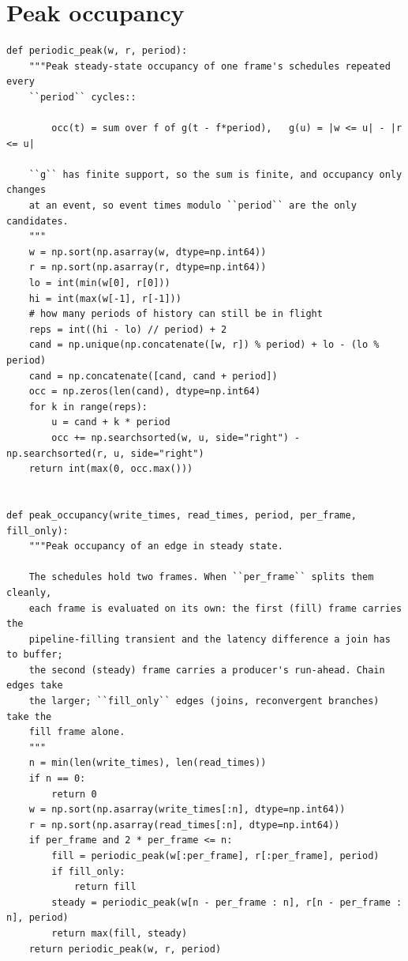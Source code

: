 \documentclass[10pt,a4paper]{article}
\begin{document}
\section{Peak occupancy}\label{sec:peak}

\begin{lstlisting}[firstnumber=306,title={\texttt{src/finn/transformation/fpgadataflow/derive\_characteristic.py}, lines 306--351}]
def periodic_peak(w, r, period):
    """Peak steady-state occupancy of one frame's schedules repeated every
    ``period`` cycles::

        occ(t) = sum over f of g(t - f*period),   g(u) = |w <= u| - |r <= u|

    ``g`` has finite support, so the sum is finite, and occupancy only changes
    at an event, so event times modulo ``period`` are the only candidates.
    """
    w = np.sort(np.asarray(w, dtype=np.int64))
    r = np.sort(np.asarray(r, dtype=np.int64))
    lo = int(min(w[0], r[0]))
    hi = int(max(w[-1], r[-1]))
    # how many periods of history can still be in flight
    reps = int((hi - lo) // period) + 2
    cand = np.unique(np.concatenate([w, r]) % period) + lo - (lo % period)
    cand = np.concatenate([cand, cand + period])
    occ = np.zeros(len(cand), dtype=np.int64)
    for k in range(reps):
        u = cand + k * period
        occ += np.searchsorted(w, u, side="right") - np.searchsorted(r, u, side="right")
    return int(max(0, occ.max()))


def peak_occupancy(write_times, read_times, period, per_frame, fill_only):
    """Peak occupancy of an edge in steady state.

    The schedules hold two frames. When ``per_frame`` splits them cleanly,
    each frame is evaluated on its own: the first (fill) frame carries the
    pipeline-filling transient and the latency difference a join has to buffer;
    the second (steady) frame carries a producer's run-ahead. Chain edges take
    the larger; ``fill_only`` edges (joins, reconvergent branches) take the
    fill frame alone.
    """
    n = min(len(write_times), len(read_times))
    if n == 0:
        return 0
    w = np.sort(np.asarray(write_times[:n], dtype=np.int64))
    r = np.sort(np.asarray(read_times[:n], dtype=np.int64))
    if per_frame and 2 * per_frame <= n:
        fill = periodic_peak(w[:per_frame], r[:per_frame], period)
        if fill_only:
            return fill
        steady = periodic_peak(w[n - per_frame : n], r[n - per_frame : n], period)
        return max(fill, steady)
    return periodic_peak(w, r, period)
\end{lstlisting}
\end{document}
